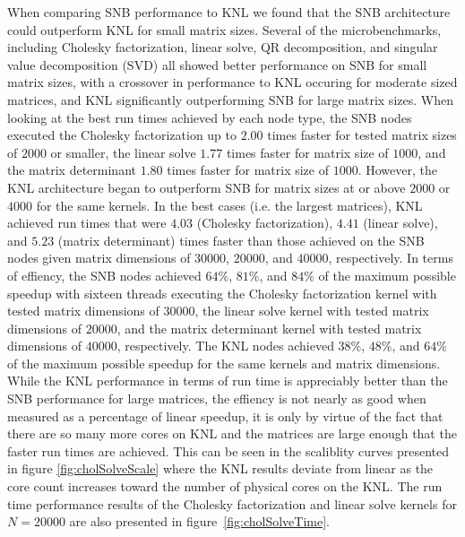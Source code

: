 When comparing SNB performance to KNL we found that the SNB architecture could outperform
KNL for small matrix sizes. Several of the microbenchmarks, including Cholesky
factorization, linear solve, QR decomposition, and singular value decomposition (SVD) all
showed better performance on SNB for small matrix sizes, with a crossover in performance
to KNL occuring for moderate sized matrices, and KNL significantly outperforming SNB for
large matrix sizes. When looking at the best run times achieved by each node type, the SNB
nodes executed the Cholesky factorization up to $2.00$ times faster for tested matrix
sizes of $2000$ or smaller, the linear solve $1.77$ times faster for matrix size of
$1000$, and the matrix determinant $1.80$ times faster for matrix size of $1000$. However,
the KNL architecture began to outperform SNB for matrix sizes at or above $2000$ or $4000$
for the same kernels. In the best cases (i.e. the largest matrices), KNL achieved run
times that were $4.03$ (Cholesky factorization), $4.41$ (linear solve), and $5.23$ (matrix
determinant) times faster than those achieved on the SNB nodes given matrix dimensions of
$30000$, $20000$, and $40000$, respectively. In terms of effiency, the SNB nodes achieved
$64\%$, $81\%$, and $84\%$ of the maximum possible speedup with sixteen threads executing
the Cholesky factorization kernel with tested matrix dimensions of $30000$, the linear
solve kernel with tested matrix dimensions of $20000$, and the matrix determinant kernel
with tested matrix dimensions of $40000$, respectively. The KNL nodes achieved $38\%$,
$48\%$, and $64\%$ of the maximum possible speedup for the same kernels and matrix
dimensions. While the KNL performance in terms of run time is appreciably better than the
SNB performance for large matrices, the effiency is not nearly as good when measured as a
percentage of linear speedup, it is only by virtue of the fact that there are so many more
cores on KNL and the matrices are large enough that the faster run times are achieved.
This can be seen in the scaliblity curves presented in figure \ref{fig:cholSolveScale}
where the KNL results deviate from linear as the core count increases toward the number of
physical cores on the KNL. The run time performance results of the Cholesky factorization
and linear solve kernels for $N=20000$ are also presented in
figure~\ref{fig:cholSolveTime}.

